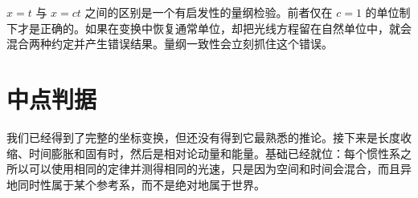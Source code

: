 \(x=t\) 与 \(x=ct\) 之间的区别是一个有启发性的量纲检验。前者仅在 \(c=1\) 的单位制下才是正确的。如果在变换中恢复通常单位，却把光线方程留在自然单位中，就会混合两种约定并产生错误结果。量纲一致性会立刻抓住这个错误。

\section{中点判据}

\begin{classroomqa}
\end{classroomqa}

我们已经得到了完整的坐标变换，但还没有得到它最熟悉的推论。接下来是长度收缩、时间膨胀和固有时，然后是相对论动量和能量。基础已经就位：每个惯性系之所以可以使用相同的定律并测得相同的光速，只是因为空间和时间会混合，而且异地同时性属于某个参考系，而不是绝对地属于世界。